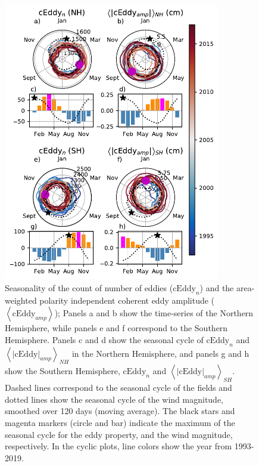 \documentclass[draft,linenumbers]{agujournal2019}
\newcommand{\cEddy}{\textrm{cEddy}}
\begin{document}
	\begin{figure}
	    \centering
	    \includegraphics[width=95mm]{figures/All_polar_plots_eddy_stats_polarity_V3.pdf}
	    \caption{
		Seasonality of the count of number of eddies ($\cEddy
		_n$) and the area-weighted polarity independent coherent eddy amplitude ($\left<\cEddy_{amp}\right>$); Panels a and b show the time-series of the Northern Hemisphere, while panels e and f correspond to the Southern Hemisphere. Panels c and d show the seasonal cycle of $\cEddy_n$ and $\left<|\cEddy|_{amp}\right>_{NH}$ in the Northern Hemisphere, and panels g and h show the Southern Hemisphere, $\cEddy_n$ and $\left<|\cEddy|_{amp}\right>_{SH}$.
		Dashed lines correspond to the seasonal cycle of the fields and dotted lines show the seasonal cycle of the wind magnitude, smoothed over 120 days (moving average). 
		The black stars and magenta markers (circle and bar) indicate the maximum of the seasonal cycle for the eddy property, and the wind magnitude, respectively. In the cyclic plots, line colors show the year from 1993-2019.}
	    \label{fig:eddy_stats}
	\end{figure}
\end{document}
